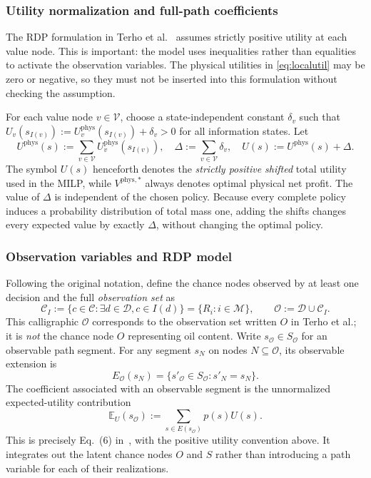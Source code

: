 \documentclass[11pt,a4paper]{article}
\newcommand{\calM}{\mathcal{M}}
\begin{document}
\subsubsection{Utility normalization and full-path coefficients}
The RDP formulation in Terho et al.~\cite[Eq.~(8)]{Terho2026}
assumes strictly positive utility at each value node.  This is
important: the model uses inequalities rather than equalities to
activate the observation variables.  The physical utilities in
\eqref{eq:localutil} may be zero or negative, so they must not be
inserted into this formulation without checking the assumption.

For each value node $v\in\mathcal V$, choose a state-independent
constant $\delta_v$ such that
$U_v(s_{I(v)}):=U_v^{\mathrm{phys}}(s_{I(v)})+\delta_v>0$
for all information states.  Let
\begin{equation}\label{eq:shift}
 U^{\mathrm{phys}}(s):=
    \sum_{v\in\mathcal V}U_v^{\mathrm{phys}}(s_{I(v)}),
 \quad
 \Delta:=\sum_{v\in\mathcal V}\delta_v,
 \quad
 U(s):=U^{\mathrm{phys}}(s)+\Delta.
\end{equation}
The symbol $U(s)$ henceforth denotes the \emph{strictly positive
shifted} total utility used in the MILP, while
$V^{\mathrm{phys},*}$ always denotes optimal physical net profit.
The value of $\Delta$ is independent of the chosen policy.  Because
every complete policy induces a probability distribution of total mass
one, adding the shifts changes every expected value by exactly
$\Delta$, without changing the optimal policy.

\subsubsection{Observation variables and RDP model}
Following the original notation, define the chance nodes observed by
at least one decision and the full \emph{observation set} as
\begin{equation}\label{eq:observationset}
 \mathcal C_I:=\{c\in\mathcal C:\exists d\in\mathcal D,
                      c\in I(d)\}=\{R_i:i\in\calM\},\qquad
 \mathcal O:=\mathcal D\cup\mathcal C_I.
\end{equation}
This calligraphic $\mathcal O$ corresponds to the observation set
written $O$ in Terho et al.; it is \emph{not} the chance node $O$
representing oil content.  Write $s_{\mathcal O}\in S_{\mathcal O}$
for an observable path segment.  For any segment $s_N$ on nodes
$N\subseteq\mathcal O$, its observable extension is
\begin{equation}\label{eq:obs-extension}
 E_{\mathcal O}(s_N)
 =\{s'_{\mathcal O}\in S_{\mathcal O}:s'_N=s_N\}.
\end{equation}
The coefficient associated with an observable segment is the
unnormalized expected-utility contribution
\begin{equation}\label{eq:eucoefficient}
 \mathbb E_U(s_{\mathcal O})
 :=\sum_{s\in E(s_{\mathcal O})}p(s)U(s).
\end{equation}
This is precisely Eq.~(6) in~\cite{Terho2026}, with the positive
utility convention above.  It integrates out the latent chance nodes
$O$ and $S$ rather than introducing a path variable for each of
their realizations.
\end{document}
